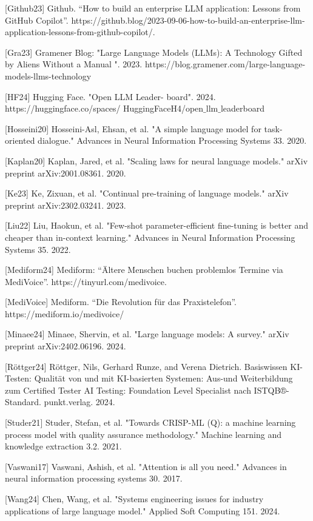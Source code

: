 \documentclass[twocolumn]{article}
\begin{document}
[Github23] Github. “How to build an enterprise LLM application: Lessons from GitHub Copilot”. https://github.blog/2023-09-06-how-to-build-an-enterprise-llm-application-lessons-from-github-copilot/.

[Gra23] Gramener Blog: "Large Language Models (LLMs): A Technology Gifted by Aliens Without a Manual ". 2023. https://blog.gramener.com/large-language-models-llms-technology

[HF24] Hugging Face. "Open LLM Leader- board". 2024. https://huggingface.co/spaces/
HuggingFaceH4/open$\_$llm$\_$leaderboard

[Hosseini20] Hosseini-Asl, Ehsan, et al. "A simple language model for task-oriented dialogue." Advances in Neural Information Processing Systems 33. 2020.

[Kaplan20] Kaplan, Jared, et al. "Scaling laws for neural language models." arXiv preprint arXiv:2001.08361. 2020. 

[Ke23] Ke, Zixuan, et al. "Continual pre-training of language models." arXiv preprint arXiv:2302.03241. 2023.

[Liu22] Liu, Haokun, et al. "Few-shot parameter-efficient fine-tuning is better and cheaper than in-context learning." Advances in Neural Information Processing Systems 35. 2022.

[Mediform24] Mediform: “Ältere Menschen buchen problemlos Termine via MediVoice”. https://tinyurl.com/medivoice.

[MediVoice] Mediform. “Die Revolution für das Praxistelefon”. https://mediform.io/medivoice/

[Minaee24] Minaee, Shervin, et al. "Large language models: A survey." arXiv preprint arXiv:2402.06196. 2024.

[Röttger24] Röttger, Nils, Gerhard Runze, and Verena Dietrich. Basiswissen KI-Testen: Qualität von und mit KI-basierten Systemen: Aus-und Weiterbildung zum Certified Tester AI Testing: Foundation Level Specialist nach ISTQB®-Standard. punkt.verlag. 2024.

[Studer21] Studer, Stefan, et al. "Towards CRISP-ML (Q): a machine learning process model with quality assurance methodology." Machine learning and knowledge extraction 3.2. 2021.

[Vaswani17] Vaswani, Ashish, et al. "Attention is all you need." Advances in neural information processing systems 30. 2017.

[Wang24] Chen, Wang, et al. "Systems engineering issues for industry applications of large language model." Applied Soft Computing 151. 2024.
\end{document}
